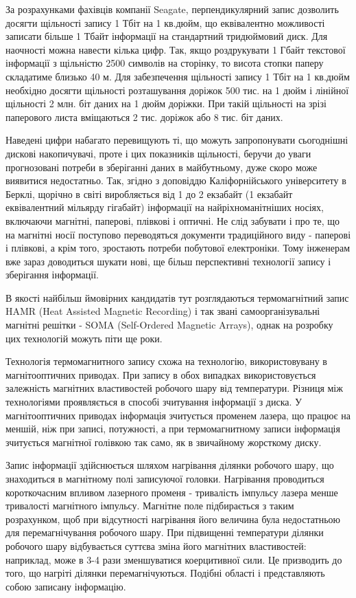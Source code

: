 \documentclass[a4paper,14pt]{extreport}
\begin{document}
За розрахунками фахівців компанії Seagate, перпендикулярний запис дозволить досягти щільності запису 1 Тбіт на 1 кв.дюйм, що еквівалентно можливості записати більше 1 Тбайт інформації на стандартний тридюймовий диск. Для наочності можна навести кілька цифр. Так, якщо роздрукувати 1 Гбайт текстової інформації з щільністю 2500 символів на сторінку, то висота стопки паперу складатиме близько 40 м. Для забезпечення щільності запису 1 Тбіт на 1 кв.дюйм необхідно досягти щільності розташування доріжок 500 тис. на 1 дюйм і лінійної щільності 2 млн. біт даних на 1 дюйм доріжки. При такій щільності на зрізі паперового листа вміщаються 2 тис. доріжок або 8 тис. біт даних.\par

Наведені цифри набагато перевищують ті, що можуть запропонувати сьогоднішні дискові накопичувачі, проте і цих показників щільності, беручи до уваги прогнозовані потреби в зберіганні даних в майбутньому, дуже скоро може виявитися недостатньо. Так, згідно з доповіддю Каліфорнійського університету в Берклі\cite{lit6}, щорічно в світі виробляється від 1 до 2 екзабайт (1 екзабайт еквівалентний мільярду гігабайт) інформації на найріхноманітніших носіях, включаючи магнітні, паперові, плівкові і оптичні. Не слід забувати і про те, що на магнітні носії поступово переводяться документи традиційного виду - паперові і плівкові, а крім того, зростають потреби побутової електроніки. Тому інженерам вже зараз доводиться шукати нові, ще більш перспективні технології запису і зберігання інформації.\par

В якості найбільш ймовірних кандидатів тут розглядаються термомагнітний запис HAMR\cite{lit8}  (Heat Assisted Magnetic Recording) і так звані самоорганізувальні магнітні решітки - SOMA\cite{lit7} (Self-Ordered Magnetic Arrays), однак на розробку цих технологій можуть піти ще роки.

Технологія термомагнитного запису схожа на технологію, використовувану в магнітооптичних приводах. При запису в обох випадках використовується залежність магнітних властивостей робочого шару від температури. Різниця між технологіями проявляється в способі зчитування інформації з диска. У магнітооптичних приводах інформація зчитується променем лазера, що працює на меншій, ніж при записі, потужності, а при термомагнитному записи інформація зчитується магнітної голівкою так само, як в звичайному жорсткому диску.\par

Запис інформації здійснюється шляхом нагрівання ділянки робочого шару, що знаходиться в магнітному полі записуючої головки. Нагрівання проводиться короткочасним впливом лазерного променя - тривалість імпульсу лазера менше тривалості магнітного імпульсу. Магнітне поле підбирається з таким розрахунком, щоб при відсутності нагрівання його величина була недостатньою для перемагнічування робочого шару. При підвищенні температури ділянки робочого шару відбувається суттєва зміна його магнітних властивостей: наприклад, може в 3-4 рази зменшуватися коерцитивної сили. Це призводить до того, що нагріті ділянки перемагнічуються. Подібні області і представляють собою записану інформацію.\par
\end{document}
